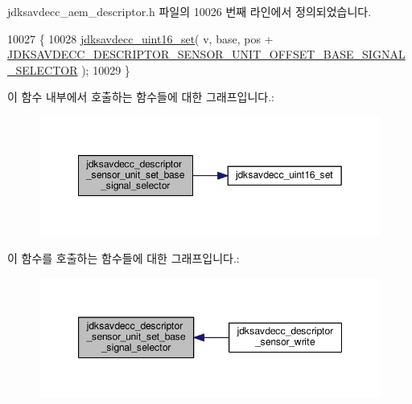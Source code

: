 jdksavdecc\+\_\+aem\+\_\+descriptor.\+h 파일의 10026 번째 라인에서 정의되었습니다.


\begin{DoxyCode}
10027 \{
10028     \hyperlink{group__endian_ga14b9eeadc05f94334096c127c955a60b}{jdksavdecc\_uint16\_set}( v, base, pos + 
      \hyperlink{group__descriptor__sensor_ga8050e1528bdea79b2151a88e223e80dd}{JDKSAVDECC\_DESCRIPTOR\_SENSOR\_UNIT\_OFFSET\_BASE\_SIGNAL\_SELECTOR}
       );
10029 \}
\end{DoxyCode}


이 함수 내부에서 호출하는 함수들에 대한 그래프입니다.\+:
\nopagebreak
\begin{figure}[H]
\begin{center}
\leavevmode
\includegraphics[width=349pt]{group__descriptor__sensor_ga54e4ff061b40ed84e483ff3c6a819520_cgraph}
\end{center}
\end{figure}




이 함수를 호출하는 함수들에 대한 그래프입니다.\+:
\nopagebreak
\begin{figure}[H]
\begin{center}
\leavevmode
\includegraphics[width=347pt]{group__descriptor__sensor_ga54e4ff061b40ed84e483ff3c6a819520_icgraph}
\end{center}
\end{figure}


